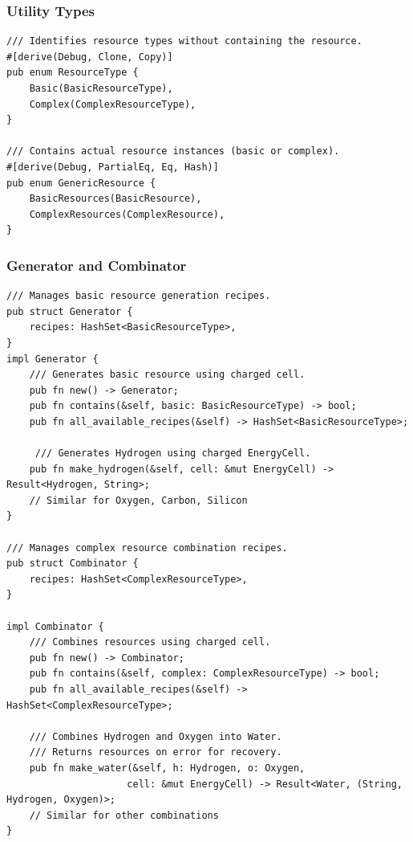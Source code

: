 \documentclass[12pt,a4paper]{article}
\begin{document}
\subsubsection{Utility Types}
\begin{lstlisting}[style=rustcool, caption={Resource Utility Types}, label=lst:resource-utility]
/// Identifies resource types without containing the resource.
#[derive(Debug, Clone, Copy)]
pub enum ResourceType {
    Basic(BasicResourceType),
    Complex(ComplexResourceType),
}

/// Contains actual resource instances (basic or complex).
#[derive(Debug, PartialEq, Eq, Hash)]
pub enum GenericResource {
    BasicResources(BasicResource),
    ComplexResources(ComplexResource),
}
\end{lstlisting}

\newpage

\subsubsection{Generator and Combinator}
\begin{lstlisting}[style=rustcool, caption={Resource Creation Interfaces}, label=lst:resource-creation]
/// Manages basic resource generation recipes.
pub struct Generator {
    recipes: HashSet<BasicResourceType>,
}
impl Generator {
    /// Generates basic resource using charged cell.
    pub fn new() -> Generator;
    pub fn contains(&self, basic: BasicResourceType) -> bool;
    pub fn all_available_recipes(&self) -> HashSet<BasicResourceType>;
     
     /// Generates Hydrogen using charged EnergyCell.
    pub fn make_hydrogen(&self, cell: &mut EnergyCell) -> Result<Hydrogen, String>;
    // Similar for Oxygen, Carbon, Silicon
} 

/// Manages complex resource combination recipes.
pub struct Combinator {
    recipes: HashSet<ComplexResourceType>,
}

impl Combinator {
    /// Combines resources using charged cell.
    pub fn new() -> Combinator;
    pub fn contains(&self, complex: ComplexResourceType) -> bool;
    pub fn all_available_recipes(&self) -> HashSet<ComplexResourceType>;
    
    /// Combines Hydrogen and Oxygen into Water.
    /// Returns resources on error for recovery.
    pub fn make_water(&self, h: Hydrogen, o: Oxygen, 
                     cell: &mut EnergyCell) -> Result<Water, (String, Hydrogen, Oxygen)>;
    // Similar for other combinations
}
\end{lstlisting}
\end{document}
